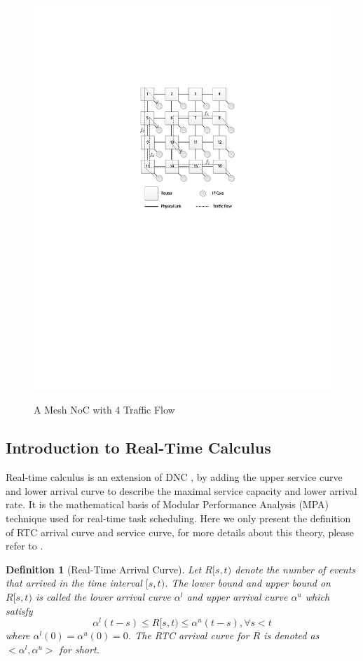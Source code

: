 \documentclass[10pt,journal]{IEEEtran}
\newtheorem{definition}{Definition}
\begin{document}
\begin{figure}
  \centering
  \includegraphics[scale=0.9]{figures/mesh.pdf}\\
  \caption{A Mesh NoC with 4 Traffic Flow}\label{topology}
\end{figure}

\subsection{Introduction to Real-Time Calculus}
Real-time calculus is an extension of DNC \cite{ThCN00}\cite{1253607}, by adding the upper service curve and lower arrival curve to describe the maximal service capacity and lower arrival rate. It is the mathematical basis of Modular Performance Analysis (MPA) \cite{Wandeler2006System} technique used for real-time task scheduling. Here we only present the definition of RTC arrival curve and service curve, for more details about this theory, please refer to \cite{ThCN00}\cite{1253607}.
\begin{definition}[Real-Time Arrival Curve]
Let $R[s,t)$ denote the number of events that arrived in the time interval $[s,t)$. The lower bound and upper bound on $R[s,t)$ is called the lower arrival curve $\alpha^l$ and upper arrival curve $\alpha^u$ which satisfy
$$\alpha^l(t-s)\leq R[s,t)\leq \alpha^u(t-s),\forall s<t$$
where $\alpha^l(0)=\alpha^u(0)=0$. The RTC arrival curve for $R$ is denoted as $<\alpha^l,\alpha^u>$ for short.
\end{definition}
\end{document}
